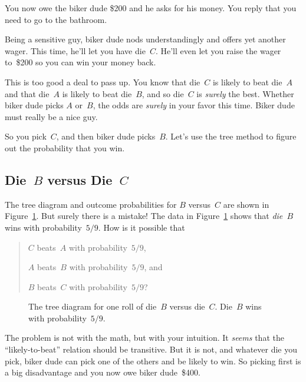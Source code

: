 You now owe the biker dude \$200 and he asks for his money.  You reply
that you need to go to the bathroom.

Being a sensitive guy, biker dude nods understandingly and offers yet
another wager.  This time, he'll let you have die~$C$.  He'll even let
you raise the wager to~\$200 so you can win your money back.

This is too good a deal to pass up.  You know that die~$C$ is likely
to beat die~$A$ and that die~$A$ is likely to beat die~$B$, and so
die~$C$ is \emph{surely} the best.  Whether biker dude picks $A$
or~$B$, the odds are \emph{surely} in your favor this time.  Biker
dude must really be a nice guy.

So you pick~$C$, and then biker dude picks~$B$.  Let's use the tree
method to figure out the probability that you win.

\subsection{Die~$B$ versus Die~$C$}

The tree diagram and outcome probabilities for $B$ versus~$C$ are
shown in Figure~\ref{fig:14A10}.  But surely there is a mistake!  The
data in Figure~\ref{fig:14A10} shows that \emph{die~$B$} wins with
probability~$5/9$.  How is it possible that
\begin{quote}

$C$ beats~$A$ with probability~$5/9$,

$A$ beats~$B$ with probability~$5/9$, and

$B$ beats~$C$ with probability~$5/9$?

\end{quote}

\begin{figure}


\caption{The tree diagram for one roll of die~$B$ versus die~$C$.
  Die~$B$ wins with probability~$5/9$.}

\label{fig:14A10}

\end{figure}

The problem is not with the math, but with your intuition.  It
\emph{seems} that the ``likely-to-beat'' relation should be
transitive.  But it is not, and whatever die you pick, biker dude can
pick one of the others and be likely to win.  So picking first is a
big disadvantage and you now owe biker dude~\$400.

